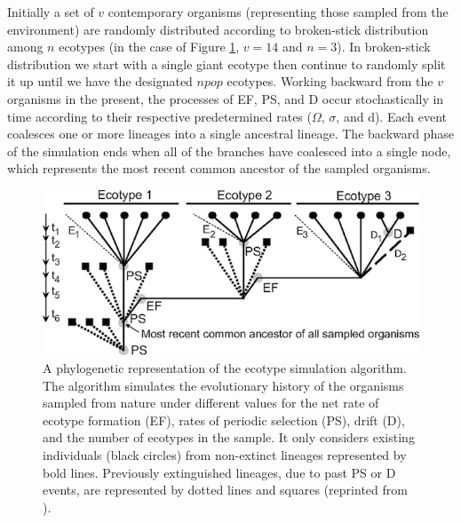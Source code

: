 Initially a set of $v$ contemporary organisms (representing those sampled from the environment) are randomly distributed according to broken-stick distribution among $n$ ecotypes (in the case of Figure \ref{fig:SpeciationGraph}, $v = 14$ and $n = 3$).
In broken-stick distribution we start with a single giant ecotype then continue to randomly split it up until we have the designated $npop$ ecotypes.
Working backward from the $v$ organisms in the present, the processes of EF, PS, and D occur stochastically in time according to their respective predetermined rates ($\Omega$, $\sigma$, and d).
Each event coalesces one or more lineages into  a single ancestral lineage.
The backward phase of the simulation ends when all of the branches have coalesced into a single node, which represents the most recent common ancestor of the sampled organisms.

\begin{figure}[h!]

  \centering
   \includegraphics{images/Speciation-CH2}
   \caption[Detailed phylogeny with putative ecotype simulation events.]{A phylogenetic representation of the ecotype simulation algorithm. The algorithm simulates the evolutionary history of the organisms sampled from nature under different values for the net rate of ecotype formation (EF), rates of periodic selection (PS), drift (D), and the number of ecotypes in the sample. It only considers existing individuals (black circles) from non-extinct lineages represented by bold lines. Previously extinguished lineages, due to past PS or D events, are represented by dotted lines and squares (reprinted from \protect\cite{koeppel2008identifying}).}
   \label{fig:SpeciationGraph}
\end{figure}

